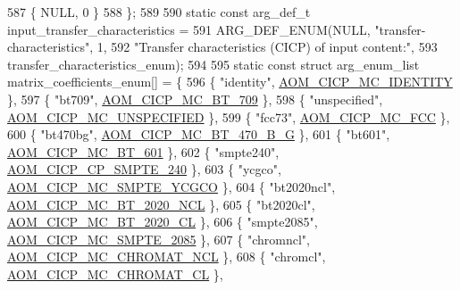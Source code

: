 \begin{DoxyCodeInclude}
{{{{{{{587     \{ NULL, 0 \}
588 \};
589 
590 \textcolor{keyword}{static} \textcolor{keyword}{const} arg\_def\_t input\_transfer\_characteristics =
591     ARG\_DEF\_ENUM(NULL, \textcolor{stringliteral}{"transfer-characteristics"}, 1,
592         \textcolor{stringliteral}{"Transfer characteristics (CICP) of input content:"},
593         transfer\_characteristics\_enum);
594 
595 \textcolor{keyword}{static} \textcolor{keyword}{const} \textcolor{keyword}{struct }arg\_enum\_list matrix\_coefficients\_enum[] = \{
596     \{ \textcolor{stringliteral}{"identity"}, \hyperlink{aom__image_8h_a6bc018ed9689367acae810bc58527081a17489bf0aed544427f7c6bbe4837b212}{AOM\_CICP\_MC\_IDENTITY} \},
597     \{ \textcolor{stringliteral}{"bt709"}, \hyperlink{aom__image_8h_a6bc018ed9689367acae810bc58527081aa70fd9b88bc91bd0d126aaa07421c49a}{AOM\_CICP\_MC\_BT\_709} \},
598     \{ \textcolor{stringliteral}{"unspecified"}, \hyperlink{aom__image_8h_a6bc018ed9689367acae810bc58527081a06a4defb1e5d9bb1d2aad092b8656a03}{AOM\_CICP\_MC\_UNSPECIFIED} \},
599     \{ \textcolor{stringliteral}{"fcc73"}, \hyperlink{aom__image_8h_a6bc018ed9689367acae810bc58527081ae368663c2c2f34683b513e159c5738b9}{AOM\_CICP\_MC\_FCC} \},
600     \{ \textcolor{stringliteral}{"bt470bg"}, \hyperlink{aom__image_8h_a6bc018ed9689367acae810bc58527081ae9107262b437659514abdcd928e977db}{AOM\_CICP\_MC\_BT\_470\_B\_G} \},
601     \{ \textcolor{stringliteral}{"bt601"}, \hyperlink{aom__image_8h_a6bc018ed9689367acae810bc58527081a0f81310501079cc1184d5265ae2c18a5}{AOM\_CICP\_MC\_BT\_601} \},
602     \{ \textcolor{stringliteral}{"smpte240"}, \hyperlink{aom__image_8h_a5267ad095a088ece3499336812503cefa1a8b2e5694489121f80a406d9da25dfb}{AOM\_CICP\_CP\_SMPTE\_240} \},
603     \{ \textcolor{stringliteral}{"ycgco"}, \hyperlink{aom__image_8h_a6bc018ed9689367acae810bc58527081aa2140164b26b42404c376cc921ce27c5}{AOM\_CICP\_MC\_SMPTE\_YCGCO} \},
604     \{ \textcolor{stringliteral}{"bt2020ncl"}, \hyperlink{aom__image_8h_a6bc018ed9689367acae810bc58527081adf60aa79c6a68f4eb41e1095f8bf7bf6}{AOM\_CICP\_MC\_BT\_2020\_NCL} \},
605     \{ \textcolor{stringliteral}{"bt2020cl"}, \hyperlink{aom__image_8h_a6bc018ed9689367acae810bc58527081a34148eae7b467eece6af5c90405dde6b}{AOM\_CICP\_MC\_BT\_2020\_CL} \},
606     \{ \textcolor{stringliteral}{"smpte2085"}, \hyperlink{aom__image_8h_a6bc018ed9689367acae810bc58527081a3aeb0ed0afc0a92ce758f109cd05ee80}{AOM\_CICP\_MC\_SMPTE\_2085} \},
607     \{ \textcolor{stringliteral}{"chromncl"}, \hyperlink{aom__image_8h_a6bc018ed9689367acae810bc58527081a30661e9d9b70ffe9f51f3bdbfd02865b}{AOM\_CICP\_MC\_CHROMAT\_NCL} \},
608     \{ \textcolor{stringliteral}{"chromcl"}, \hyperlink{aom__image_8h_a6bc018ed9689367acae810bc58527081aa391f9255e4775da0120f7472b417193}{AOM\_CICP\_MC\_CHROMAT\_CL} \},
}}}}}}}
\end{DoxyCodeInclude}
